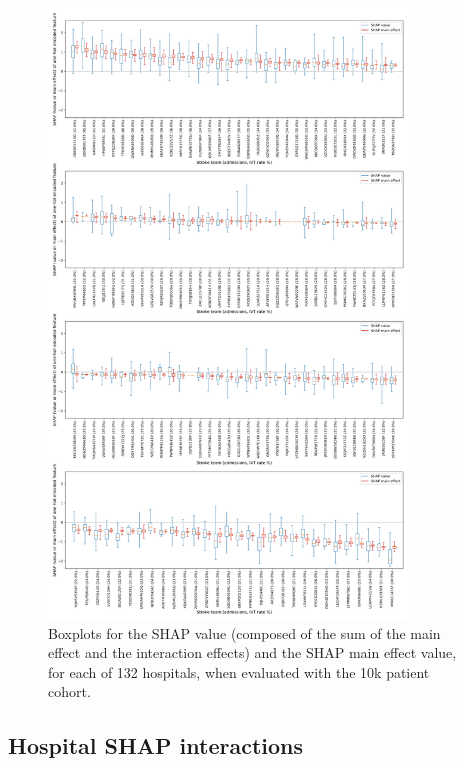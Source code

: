 \begin{figure}
\centering
\includegraphics[width=0.85\textwidth]{./images/04_xgb_10_features_10k_cohort_individual_hosp_shap_value_and_maineffect_attend_vs_notattend_boxplot}
\caption{Boxplots for the SHAP value (composed of the sum of the main effect and the interaction effects) and the SHAP main effect value, for each of 132 hospitals, when evaluated with the 10k patient cohort.}
\label{fig:shap_boxplot_2}
\end{figure}



\subsection{Hospital SHAP interactions}

